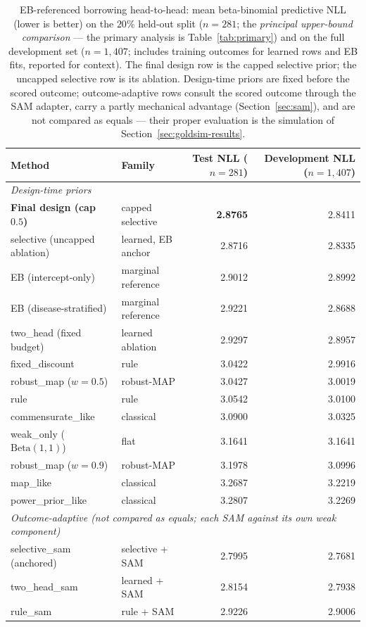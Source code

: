 \documentclass[11pt]{article}
\begin{document}
\begin{table}[htbp]
\centering
\caption{EB-referenced borrowing head-to-head: mean beta-binomial predictive
NLL (lower is better) on the $20\%$ held-out split ($n=281$; the
\emph{principal upper-bound comparison} --- the primary analysis is
Table~\ref{tab:primary}) and on the full development set ($n=1{,}407$;
includes training
outcomes for learned rows and EB fits, reported for context). The final
design row is the capped selective prior; the uncapped selective row is
its ablation. Design-time
priors are fixed before the scored outcome; outcome-adaptive rows consult the
scored outcome through the SAM adapter, carry a partly mechanical advantage
(Section~\ref{sec:sam}), and are not compared as equals --- their proper
evaluation is the simulation of Section~\ref{sec:goldsim-results}.}
\label{tab:headtohead}
\small
\begin{tabular}{llrr}
\toprule
Method & Family & Test NLL ($n{=}281$) & Development NLL ($n{=}1{,}407$) \\
\midrule
\multicolumn{4}{l}{\emph{Design-time priors}}\\
\textbf{Final design (cap $0.5$)} & capped selective & \textbf{2.8765} & 2.8411 \\
selective (uncapped ablation) & learned, EB anchor & 2.8716 & 2.8335 \\
EB (intercept-only) & marginal reference & 2.9012 & 2.8992 \\
EB (disease-stratified) & marginal reference & 2.9221 & 2.8688 \\
two\_head (fixed budget) & learned ablation & 2.9297 & 2.8957 \\
fixed\_discount & rule & 3.0422 & 2.9916 \\
robust\_map ($w{=}0.5$) & robust-MAP & 3.0427 & 3.0019 \\
rule & rule & 3.0542 & 3.0100 \\
commensurate\_like & classical & 3.0900 & 3.0325 \\
weak\_only ($\mathrm{Beta}(1,1)$) & flat & 3.1641 & 3.1641 \\
robust\_map ($w{=}0.9$) & robust-MAP & 3.1978 & 3.0996 \\
map\_like & classical & 3.2687 & 3.2219 \\
power\_prior\_like & classical & 3.2807 & 3.2269 \\
\midrule
\multicolumn{4}{l}{\emph{Outcome-adaptive (not compared as equals; each SAM against its own weak component)}}\\
selective\_sam (anchored) & selective + SAM & 2.7995 & 2.7681 \\
two\_head\_sam & learned + SAM & 2.8154 & 2.7938 \\
rule\_sam & rule + SAM & 2.9226 & 2.9006 \\
\bottomrule
\end{tabular}
\end{table}
\end{document}

